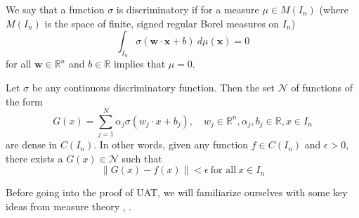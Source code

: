 \begin{definition}
    We say that a function $\sigma$ is discriminatory if for a measure $\mu \in M(I_n)$ (where $M(I_n)$ is the space 
of finite, signed regular Borel measures on $I_n$) 
$$\int_{I_n} \sigma (\mathbf{w}\cdot\mathbf{x} + b) \ d\mu(\mathbf{x}) = 0$$
for all $\mathbf{w} \in \mathbb{R}^n$ and $b\in \mathbb{R}$ implies that $\mu = 0$.
\end{definition}
\begin{thm}
    \label{thm:UAT}
    Let $\sigma$ be any continuous discriminatory function. Then the set $\mathcal{N}$ of functions of the form 
    $$G(x) = \sum_{j=1}^{N} \alpha_j \sigma (w_j\cdot x + b_j), \quad w_j \in \mathbb{R}^n, \alpha_j, b_j \in \mathbb{R}, x \in I_n$$
    are dense in $C(I_n)$. In other words, given any function $f \in C(I_n)$ and $\epsilon > 0$, there exists
    a $G(x) \in \mathcal{N}$ such that 
    $$\| G(x) - f(x)\| < \epsilon \ \text{for all} \ x \in I_n$$
\end{thm}
Before going into the proof of UAT, we will familiarize ourselves with some key ideas from measure theory \cite{tao2011introduction}, \cite{kyleUAT}.
